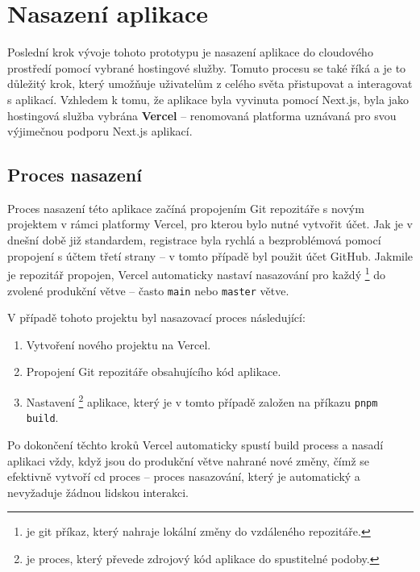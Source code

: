 \section{Nasazení aplikace}
\label{sec:implementace-deployment}
Poslední krok vývoje tohoto prototypu je nasazení aplikace do cloudového prostředí pomocí vybrané hostingové služby.
Tomuto procesu se také říká  a je to důležitý krok, který umožňuje uživatelům z celého světa přistupovat a interagovat s aplikací.
Vzhledem k tomu, že aplikace byla vyvinuta pomocí Next.js, byla jako hostingová služba vybrána \textbf{Vercel} – renomovaná platforma uznávaná pro svou výjimečnou podporu Next.js aplikací\cite{vd_vercel_com_docs}.

\subsection{Proces nasazení}
\label{subsec:implementace-proces-nasazeni}
Proces nasazení této aplikace začíná propojením Git repozitáře s novým projektem v rámci platformy Vercel, pro kterou bylo nutné vytvořit účet.
Jak je v dnešní době již standardem, registrace byla rychlá a bezproblémová pomocí propojení s účtem třetí strany – v tomto případě byl použit účet GitHub.
Jakmile je repozitář propojen, Vercel automaticky nastaví nasazování pro každý \footnote{ je git příkaz, který nahraje lokální změny do vzdáleného repozitáře\cite{g_docs_git_push}.} do zvolené produkční větve – často \texttt{main} nebo \texttt{master} větve.

V případě tohoto projektu byl nasazovací proces následující:
\begin{enumerate}
    \item Vytvoření nového projektu na Vercel.
    \item Propojení Git repozitáře obsahujícího kód aplikace.
    \item Nastavení \footnote{ je proces, který převede zdrojový kód aplikace do spustitelné podoby.} aplikace, který je v tomto případě založen na příkazu \texttt{pnpm build}.
\end{enumerate}

Po dokončení těchto kroků Vercel automaticky spustí build process a nasadí aplikaci vždy, když jsou do produkční větve nahrané nové změny, čímž se efektivně vytvoří \ac{cd} proces – proces nasazování, který je automatický a nevyžaduje žádnou lidskou interakci.

